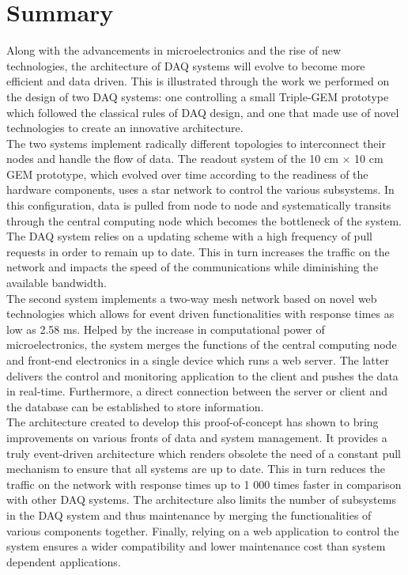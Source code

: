 \chapter{Summary}
\label{chap:III-3-summary}

  Along with the advancements in microelectronics and the rise of new technologies, the architecture of DAQ systems will evolve to become more efficient and data driven. This is illustrated through the work we performed on the design of two DAQ systems: one controlling a small Triple-GEM prototype which followed the classical rules of DAQ design, and one that made use of novel technologies to create an innovative architecture. \\

  The two systems implement radically different topologies to interconnect their nodes and handle the flow of data. The readout system of the 10 cm $ \times $ 10 cm GEM prototype, which evolved over time according to the readiness of the hardware components, uses a star network to control the various subsystems. In this configuration, data is pulled from node to node and systematically transits through the central computing node which becomes the bottleneck of the system. The DAQ system relies on a updating scheme with a high frequency of pull requests in order to remain up to date. This in turn increases the traffic on the network and impacts the speed of the communications while diminishing the available bandwidth. \\

  The second system implements a two-way mesh network based on novel web technologies which allows for event driven functionalities with response times as low as 2.58 ms. Helped by the increase in computational power of microelectronics, the system merges the functions of the central computing node and front-end electronics in a single device which runs a web server. The latter delivers the control and monitoring application to the client and pushes the data in real-time. Furthermore, a direct connection between the server or client and the database can be established to store information. \\

  The architecture created to develop this proof-of-concept has shown to bring improvements on various fronts of data and system management. It provides a truly event-driven architecture which renders obsolete the need of a constant pull mechanism to ensure that all systems are up to date. This in turn reduces the traffic on the network with response times up to 1 000 times faster in comparison with other DAQ systems. The architecture also limits the number of subsystems in the DAQ system and thus maintenance by merging the functionalities of various components together. Finally, relying on a web application to control the system ensures a wider compatibility and lower maintenance cost than system dependent applications.
